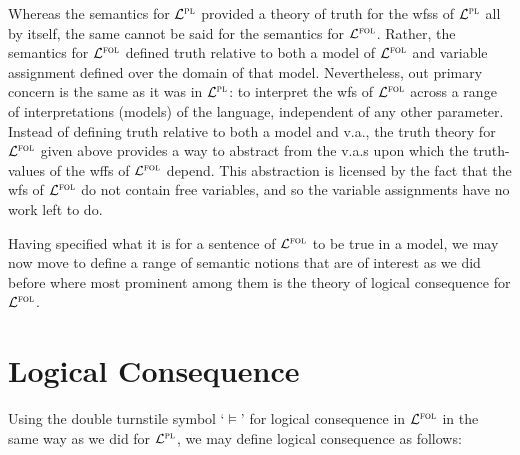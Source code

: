 Whereas the semantics for $\mathcal{L}^{\textsc{pl}}$ provided a theory of truth for the wfss of $\mathcal{L}^{\textsc{pl}}$ all by itself, the same cannot be said for the semantics for $\mathcal{L}^{\textsc{fol}}$.
Rather, the semantics for $\mathcal{L}^{\textsc{fol}}$ defined truth relative to both a model of $\mathcal{L}^{\textsc{fol}}$ and variable assignment defined over the domain of that model. 
Nevertheless, out primary concern is the same as it was in $\mathcal{L}^{\textsc{pl}}$: to interpret the wfs of $\mathcal{L}^{\textsc{fol}}$ across a range of interpretations (models) of the language, independent of any other parameter.
Instead of defining truth relative to both a model and v.a., the truth theory for $\mathcal{L}^{\textsc{fol}}$ given above provides a way to abstract from the v.a.s upon which the truth-values of the wffs of $\mathcal{L}^{\textsc{fol}}$ depend. 
This abstraction is licensed by the fact that the wfs of $\mathcal{L}^{\textsc{fol}}$ do not contain free variables, and so the variable assignments have no work left to do.

Having specified what it is for a sentence of $\mathcal{L}^{\textsc{fol}}$ to be true in a model, we may now move to define a range of semantic notions that are of interest as we did before where most prominent among them is the theory of logical consequence for $\mathcal{L}^{\textsc{fol}}$.






\section{Logical Consequence}
\label{sec.FOL-logical-consequence}

Using the double turnstile symbol `$\vDash$' for logical consequence in $\mathcal{L}^{\textsc{fol}}$ in the same way as we did for $\mathcal{L}^{\textsc{pl}}$, we may define logical consequence as follows:


